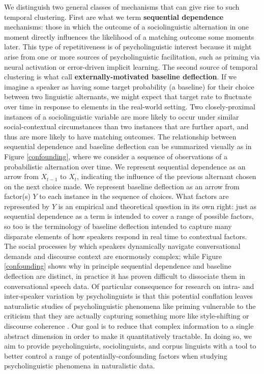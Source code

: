 \documentclass[12pt]{article}
\begin{document}
We  distinguish two general classes of mechanisms that can give rise to such temporal clustering. First are what we term \textbf{sequential dependence} mechanisms: those in which the outcome of a sociolinguistic alternation in one moment directly influences the likelihood of a matching outcome some moments later. 
This type of repetitiveness is of psycholinguistic interest because it might arise from one or more sources of psycholinguistic facilitation, such as priming via neural activation or error-driven implicit learning. 
The second source of temporal clustering is what \citet{Tamminga:2016a} call \textbf{externally-motivated baseline deflection}. If we imagine a speaker as having some target probability (a baseline) for their choice between two linguistic alternants, we might expect that target rate to fluctuate over time in response to elements in the real-world setting. Two closely-proximal instances of a sociolinguistic variable are more likely to occur under similar social-contextual circumstances than two instances that are further apart, and thus are more likely to have matching outcomes.
The relationship between sequential dependence and baseline deflection can be summarized visually as in Figure \ref{confounding}, where we consider a sequence of observations of a probabilistic alternation over time. We represent sequential dependence as an arrow from $X_{t-1}$ to $X_t$, indicating the influence of the previous alternant chosen on the next choice made. We represent baseline deflection as an arrow from factor(s) $Y$ to each instance in the sequence of choices.
What factors are represented by $Y$ is an empirical and theoretical question in its own right: just as sequential dependence as a term is intended to cover a range of possible factors, so too is the terminology of baseline deflection intended to capture many disparate elements of how speakers respond in real time to contextual factors.
The social processes by which speakers dynamically navigate conversational demands and discourse context are enormously complex; while Figure \ref{confounding} shows why in principle sequential dependence and baseline deflection are distinct, in practice it has proven difficult to dissociate them in conversational speech data.
Of particular consequence for research on intra- and inter-speaker variation by psycholinguists is that this potential conflation leaves naturalistic studies of psycholinguistic phenomena like  priming vulnerable to the criticism that they are actually capturing something more like style-shifting or discourse coherence \citep{Szmrecsanyi:2006}.
 Our goal is to reduce that complex information to a single abstract dimension in order to make it quantitatively tractable.
In doing so, we aim to provide psycholinguists, sociolinguists, and corpus linguists with a tool to better control a range of potentially-confounding factors when studying psycholinguistic phenomena in naturalistic data.
\end{document}
